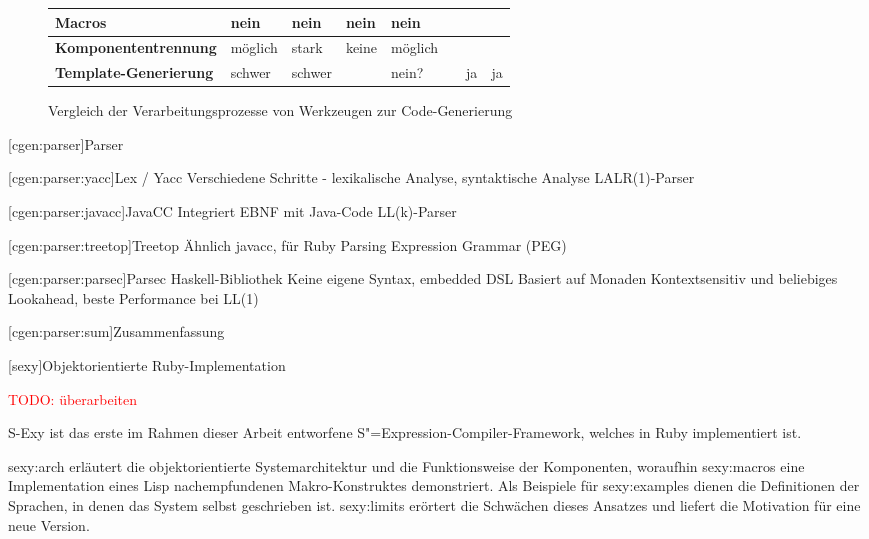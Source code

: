 \documentclass[a4paper, bibgerm]{book}
\newcommand{\todo}[1]{
  \textcolor{red}{TODO: #1}
}
\newcommand\lchapter{}
\newcommand\lsection{}
\newcommand\lsubsection{}
\newcommand\sref{}
\newcommand{\sexy}{S-Exy}
\newcommand{\sexp}{S"=Expression}
\begin{document}
\begin{figure}
\begin{tabular}{|l|l|l|l|l|l|l|l|}
\bf Macros               &nein           &nein                        &nein                       &nein            &                &         &            \\\hline
\bf Komponententrennung  &möglich        &stark                       &keine                      &möglich         &                &         &            \\\hline
\bf Template-Generierung &schwer         &schwer                      &                           &nein?           &                &ja       &ja          \\\hline
\end{tabular}
\caption{Vergleich der Verarbeitungsprozesse von Werkzeugen zur Code-Generierung}
\label{magicl:tab:comp}
\end{figure}

\lsection[cgen:parser]{Parser}

\lsubsection[cgen:parser:yacc]{Lex / Yacc}
Verschiedene Schritte - lexikalische Analyse, syntaktische Analyse
LALR(1)-Parser

\lsubsection[cgen:parser:javacc]{JavaCC}
 Integriert EBNF mit Java-Code
 LL(k)-Parser

\lsubsection[cgen:parser:treetop]{Treetop}
 Ähnlich javacc, für Ruby
 Parsing Expression Grammar (PEG)

\lsubsection[cgen:parser:parsec]{Parsec}
 Haskell-Bibliothek
 Keine eigene Syntax, embedded DSL
 Basiert auf Monaden
 Kontextsensitiv und beliebiges Lookahead, beste Performance bei LL(1)

\lsubsection[cgen:parser:sum]{Zusammenfassung}

\lchapter[sexy]{Objektorientierte Ruby-Implementation}

\todo{überarbeiten}

\sexy{} ist das erste im Rahmen dieser Arbeit entworfene
\sexp{}-Compiler-Framework, welches in Ruby implementiert ist.

\sref{sexy:arch} erläutert die objektorientierte
Systemarchitektur und die Funktionsweise der Komponenten, woraufhin
\sref{sexy:macros} eine Implementation eines Lisp nachempfundenen
Makro-Konstruktes demonstriert. Als Beispiele für \sref{sexy:examples}
dienen die Definitionen der Sprachen, in denen das System selbst
geschrieben ist. \sref{sexy:limits} erörtert die Schwächen dieses
Ansatzes und liefert die Motivation für eine neue Version.
\end{document}
